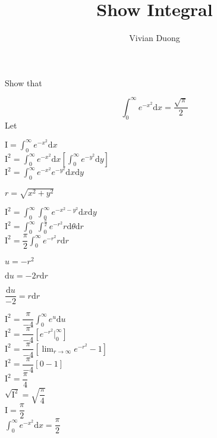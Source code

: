 \documentclass{article}
\title{Show Integral}
\author{Vivian Duong}
\begin{document}
Show that 

\begin{equation}
\int_0^\infty e^{-x^2} \mathrm{d}x = \dfrac{\sqrt{\pi}}{2}
\end{equation}
Let

\begin{center}
$\mathrm{I} = \int_0^\infty e^{-x^2} \mathrm{d}x$
\\

$\mathrm{I^2} = \int_0^\infty e^{-x^2} \mathrm{d}x[\int_0^\infty e^{-y^2} \mathrm{d}y]$
\\

$\mathrm{I^2} = \int_0^\infty e^{-x^2} e^{-y^2}  \mathrm{d}x \mathrm{d}y$
\\

\begin{flushright}
$r = \sqrt{x^2 + y^2}$
\end{flushright}


$\mathrm{I^2} = \int_0^\infty \int_0^\infty e^{-x^2 - y^2}  \mathrm{d}x \mathrm{d}y$
\\

$\mathrm{I^2} = \int_0^\infty \int_0^{\frac{\pi}{2}} e^{-r^2} r\mathrm{d}\theta \mathrm{d}r$
\\

$\mathrm{I^2} = \dfrac{\pi}{2}\int_0^\infty e^{-r^2} r\mathrm{d}r$
\begin{flushright}
$u = -r^2$

$\mathrm{d}u = -2r\mathrm{d}r$

$\dfrac{\mathrm{d}u}{-2} = r\mathrm{d}r$
\end{flushright}

$\mathrm{I^2} = \dfrac{\pi}{-4}\int_0^\infty e^{u} \mathrm{d}u$
\\

$\mathrm{I^2} = \dfrac{\pi}{-4}[e^{-r^2}|_0^\infty]$
\\

$\mathrm{I^2} = \dfrac{\pi}{-4}[\lim_{r \rightarrow \infty} e^{-r^2} - 1]$
\\

$\mathrm{I^2} = \dfrac{\pi}{-4}[0 - 1]$
\\

$\mathrm{I^2} = \dfrac{\pi}{4}$
\\

$\sqrt{\mathrm{I^2}} = \sqrt{\dfrac{\pi}{4}}$
\\

$\mathrm{I} = \dfrac{\pi}{2}$
\\

$\int_0^\infty e^{-x^2} \mathrm{d}x = \dfrac{\pi}{2}$

\end{center}
\end{document}
